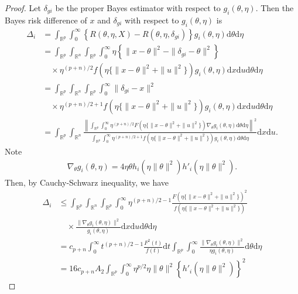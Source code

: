 \documentclass[preprint,11pt]{imsart}
\numberwithin{equation}{section}
\theoremstyle{plain}
\theoremstyle{definition}
\theoremstyle{remark}
\newcommand{\rd}{\mathrm{d}}
\begin{document}
\begin{proof}
Let $ \delta_{gi}$ be the proper Bayes estimator with respect to $g_i(\theta,\eta)$.
Then the Bayes risk difference
of $ x$ and $ \delta_{gi}$ with respect to $ g_i(\theta,\eta)$  is 
\begin{equation*}
\begin{split}
 \Delta_i &= \int_{\mathbb{R}^{p}}\int_0^\infty \left\{
R(\theta,\eta,X)-R(\theta,\eta,\delta_{gi}) \right\}
g_i(\theta,\eta)
 \rd \theta \rd\eta\\
&= \int_{\mathbb{R}^{p}}\int_{\mathbb{R}^{n}}\int_{\mathbb{R}^{p}}\int_0^\infty 
\eta\left\{\|x-\theta\|^2-\|\delta_{gi}-\theta\|^2\right\}\\
&\quad\times\eta^{(p+n)/2} f(\eta\{\|x-\theta\|^2+\|u\|^2\})g_i(\theta,\eta)
\rd x\rd u \rd \theta \rd\eta\\
 &= \int_{\mathbb{R}^{p}}\int_{\mathbb{R}^{n}}\int_{\mathbb{R}^{p}}\int_0^\infty \| \delta_{gi}-x \|^2 \\
&\quad\times\eta^{(p+n)/2+1} f(\eta\{\|x-\theta\|^2+\|u\|^2\})g_i(\theta,\eta)
\rd x\rd u \rd \theta \rd\eta\\
 &= \int_{\mathbb{R}^{p}}\int_{\mathbb{R}^{n}}
 \frac{\left\|\int_{\mathbb{R}^p}\int_0^\infty  \eta^{(p+n)/2}F(\eta\{\|x-\theta\|^2+\|u\|^2\})\nabla_\theta g_i(\theta,\eta)\rd\theta \rd\eta\right\|^2}{\int_{\mathbb{R}^p}\int_0^\infty \eta^{(p+n)/2+1} f(\eta\{\|x-\theta\|^2+\|u\|^2\})g_i(\theta,\eta)\rd\theta \rd\eta}
 \rd x\rd u.
\end{split}
\end{equation*}
 Note
 \begin{align*}
  \nabla_\theta g_i(\theta,\eta)=4\eta\theta h_i(\eta\|\theta\|^2)h'_i(\eta\|\theta\|^2).
 \end{align*}
Then, by Cauchy-Schwarz inequality, we have
\begin{equation}
\begin{split}
 \Delta_i &\leq \int_{\mathbb{R}^{p}}\int_{\mathbb{R}^{n}}\int_{\mathbb{R}^{p}}\int_0^\infty
 \eta^{(p+n)/2-1}\frac{F(\eta\{\|x-\theta\|^2+\|u\|^2\})^2}{f(\eta\{\|x-\theta\|^2+\|u\|^2\})}\\
&\quad\times \frac{\|\nabla_\theta g_i(\theta,\eta)\|^2}{g_i(\theta,\eta)}
  \rd x\rd u \rd\theta \rd\eta \\
 &=c_{p+n}\int_0^\infty t^{(p+n)/2-1}\frac{F^2(t)}{f(t)}\rd t
 \int_{\mathbb{R}^{p}}\int_0^\infty
\frac{\|\nabla_\theta g_i(\theta,\eta)\|^2}{\eta g_i(\theta,\eta)}
 \rd\theta \rd\eta \\
 &=16 c_{p+n}A_2 \int_{\mathbb{R}^{p}}\int_0^\infty \eta^{p/2}\eta\|\theta\|^2 \left\{h'_i(\eta\|\theta\|^2)\right\}^2

\end{split}
\end{equation}
\end{proof}
\end{document}
